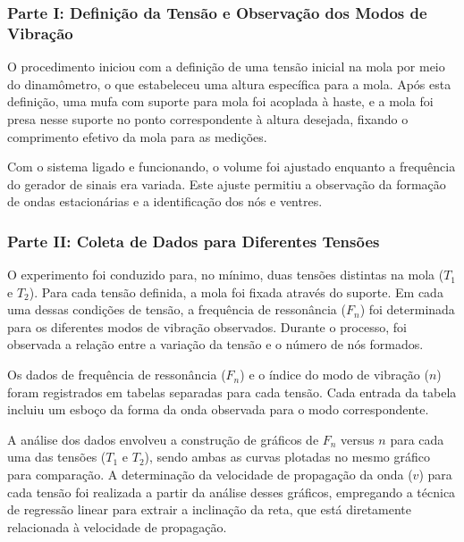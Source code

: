 \subsubsection*{Parte I: Definição da Tensão e Observação dos Modos de Vibração}

O procedimento iniciou com a definição de uma tensão inicial na mola por meio do dinamômetro, o que estabeleceu uma altura específica para a mola. Após esta definição, uma mufa com suporte para mola foi acoplada à haste, e a mola foi presa nesse suporte no ponto correspondente à altura desejada, fixando o comprimento efetivo da mola para as medições.

Com o sistema ligado e funcionando, o volume foi ajustado enquanto a frequência do gerador de sinais era variada. Este ajuste permitiu a observação da formação de ondas estacionárias e a identificação dos nós e ventres. 

\subsubsection*{Parte II: Coleta de Dados para Diferentes Tensões}

O experimento foi conduzido para, no mínimo, duas tensões distintas na mola ($T_1$ e $T_2$). Para cada tensão definida, a mola foi fixada através do suporte. Em cada uma dessas condições de tensão, a frequência de ressonância ($F_n$) foi determinada para os diferentes modos de vibração observados. Durante o processo, foi observada a relação entre a variação da tensão e o número de nós formados.

Os dados de frequência de ressonância ($F_n$) e o índice do modo de vibração ($n$) foram registrados em tabelas separadas para cada tensão. Cada entrada da tabela incluiu um esboço da forma da onda observada para o modo correspondente.


A análise dos dados envolveu a construção de gráficos de $F_n$ versus $n$ para cada uma das tensões ($T_1$ e $T_2$), sendo ambas as curvas plotadas no mesmo gráfico para comparação. A determinação da velocidade de propagação da onda ($v$) para cada tensão foi realizada a partir da análise desses gráficos, empregando a técnica de regressão linear para extrair a inclinação da reta, que está diretamente relacionada à velocidade de propagação.